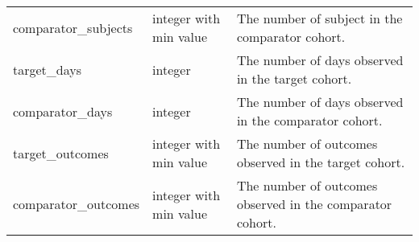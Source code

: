 \documentclass[
]{article}
\begin{document}
\begin{longtable}[]{@{}lll@{}}
\begin{minipage}[t]{0.23\columnwidth}
comparator\_subjects\strut
\end{minipage} & \begin{minipage}[t]{0.18\columnwidth}\raggedright
integer with min value\strut
\end{minipage} & \begin{minipage}[t]{0.50\columnwidth}\raggedright
The number of subject in the comparator cohort.\strut
\end{minipage}\tabularnewline
\begin{minipage}[t]{0.23\columnwidth}\raggedright
target\_days\strut
\end{minipage} & \begin{minipage}[t]{0.18\columnwidth}\raggedright
integer\strut
\end{minipage} & \begin{minipage}[t]{0.50\columnwidth}\raggedright
The number of days observed in the target cohort.\strut
\end{minipage}\tabularnewline
\begin{minipage}[t]{0.23\columnwidth}\raggedright
comparator\_days\strut
\end{minipage} & \begin{minipage}[t]{0.18\columnwidth}\raggedright
integer\strut
\end{minipage} & \begin{minipage}[t]{0.50\columnwidth}\raggedright
The number of days observed in the comparator cohort.\strut
\end{minipage}\tabularnewline
\begin{minipage}[t]{0.23\columnwidth}\raggedright
target\_outcomes\strut
\end{minipage} & \begin{minipage}[t]{0.18\columnwidth}\raggedright
integer with min value\strut
\end{minipage} & \begin{minipage}[t]{0.50\columnwidth}\raggedright
The number of outcomes observed in the target cohort.\strut
\end{minipage}\tabularnewline
\begin{minipage}[t]{0.23\columnwidth}\raggedright
comparator\_outcomes\strut
\end{minipage} & \begin{minipage}[t]{0.18\columnwidth}\raggedright
integer with min value\strut
\end{minipage} & \begin{minipage}[t]{0.50\columnwidth}\raggedright
The number of outcomes observed in the comparator cohort.\strut

\end{minipage}
\end{longtable}
\end{document}
